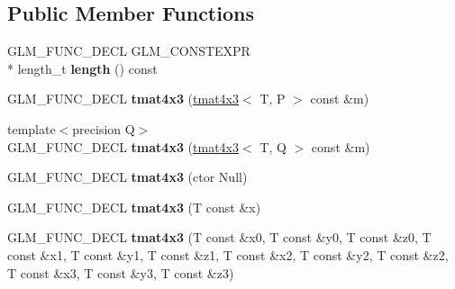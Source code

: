 \subsection*{Public Member Functions}
\begin{DoxyCompactItemize}
\item 
\hypertarget{structglm_1_1detail_1_1tmat4x3_ad35352f950b0e695e2806740e29ca57d}{G\-L\-M\-\_\-\-F\-U\-N\-C\-\_\-\-D\-E\-C\-L G\-L\-M\-\_\-\-C\-O\-N\-S\-T\-E\-X\-P\-R \\*
length\-\_\-t {\bfseries length} () const }\label{structglm_1_1detail_1_1tmat4x3_ad35352f950b0e695e2806740e29ca57d}

\item 
\hypertarget{structglm_1_1detail_1_1tmat4x3_ae77cc858418c288537a65d74d891bf00}{G\-L\-M\-\_\-\-F\-U\-N\-C\-\_\-\-D\-E\-C\-L {\bfseries tmat4x3} (\hyperlink{structglm_1_1detail_1_1tmat4x3}{tmat4x3}$<$ T, P $>$ const \&m)}\label{structglm_1_1detail_1_1tmat4x3_ae77cc858418c288537a65d74d891bf00}

\item 
\hypertarget{structglm_1_1detail_1_1tmat4x3_a5fcf4eb115cbf03560ab19f4673f9b3c}{{\footnotesize template$<$precision Q$>$ }\\G\-L\-M\-\_\-\-F\-U\-N\-C\-\_\-\-D\-E\-C\-L {\bfseries tmat4x3} (\hyperlink{structglm_1_1detail_1_1tmat4x3}{tmat4x3}$<$ T, Q $>$ const \&m)}\label{structglm_1_1detail_1_1tmat4x3_a5fcf4eb115cbf03560ab19f4673f9b3c}

\item 
\hypertarget{structglm_1_1detail_1_1tmat4x3_abcb7184aeb3a229850057e6bbdb81030}{G\-L\-M\-\_\-\-F\-U\-N\-C\-\_\-\-D\-E\-C\-L {\bfseries tmat4x3} (ctor Null)}\label{structglm_1_1detail_1_1tmat4x3_abcb7184aeb3a229850057e6bbdb81030}

\item 
\hypertarget{structglm_1_1detail_1_1tmat4x3_a2d1e973fa0706ef8e0fffa4ee23712ab}{G\-L\-M\-\_\-\-F\-U\-N\-C\-\_\-\-D\-E\-C\-L {\bfseries tmat4x3} (T const \&x)}\label{structglm_1_1detail_1_1tmat4x3_a2d1e973fa0706ef8e0fffa4ee23712ab}

\item 
\hypertarget{structglm_1_1detail_1_1tmat4x3_ae83188b56015ab7922dd9827a8795f65}{G\-L\-M\-\_\-\-F\-U\-N\-C\-\_\-\-D\-E\-C\-L {\bfseries tmat4x3} (T const \&x0, T const \&y0, T const \&z0, T const \&x1, T const \&y1, T const \&z1, T const \&x2, T const \&y2, T const \&z2, T const \&x3, T const \&y3, T const \&z3)}\label{structglm_1_1detail_1_1tmat4x3_ae83188b56015ab7922dd9827a8795f65}


\end{DoxyCompactItemize}
